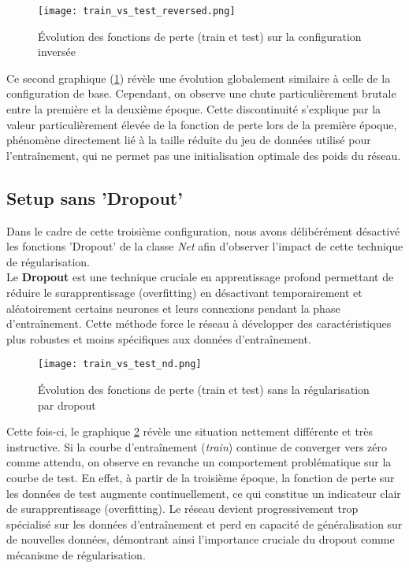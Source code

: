 \documentclass{article}
\begin{document}
\begin{figure}[H]
    \centering
    \texttt{[image: train\_vs\_test\_reversed.png]}
    \caption{Évolution des fonctions de perte (train et test) sur la configuration inversée}
    \label{fig:train_vs_test_reversed}
\end{figure}

Ce second graphique (\ref{fig:train_vs_test_reversed}) révèle une évolution globalement similaire à celle de la configuration de base. Cependant, on observe une chute particulièrement brutale entre la première et la deuxième époque. Cette discontinuité s'explique par la valeur particulièrement élevée de la fonction de perte lors de la première époque, phénomène directement lié à la taille réduite du jeu de données utilisé pour l'entraînement, qui ne permet pas une initialisation optimale des poids du réseau.

\newpage
\subsection{Setup sans 'Dropout'}
\label{Setup_nd}

Dans le cadre de cette troisième configuration, nous avons délibérément désactivé les fonctions 'Dropout' de la classe \textit{Net} afin d'observer l'impact de cette technique de régularisation.\\
Le \textbf{Dropout} est une technique cruciale en apprentissage profond permettant de réduire le surapprentissage (overfitting) en désactivant temporairement et aléatoirement certains neurones et leurs connexions pendant la phase d'entraînement. Cette méthode force le réseau à développer des caractéristiques plus robustes et moins spécifiques aux données d'entraînement.

\begin{figure}[H]
    \centering
    \texttt{[image: train\_vs\_test\_nd.png]}
    \caption{Évolution des fonctions de perte (train et test) sans la régularisation par dropout}
    \label{fig:train_vs_test_nd}
\end{figure}

Cette fois-ci, le graphique \ref{fig:train_vs_test_nd} révèle une situation nettement différente et très instructive. Si la courbe d'entraînement (\textit{train}) continue de converger vers zéro comme attendu, on observe en revanche un comportement problématique sur la courbe de test. En effet, à partir de la troisième époque, la fonction de perte sur les données de test augmente continuellement, ce qui constitue un indicateur clair de surapprentissage (overfitting). Le réseau devient progressivement trop spécialisé sur les données d'entraînement et perd en capacité de généralisation sur de nouvelles données, démontrant ainsi l'importance cruciale du dropout comme mécanisme de régularisation.
\end{document}

